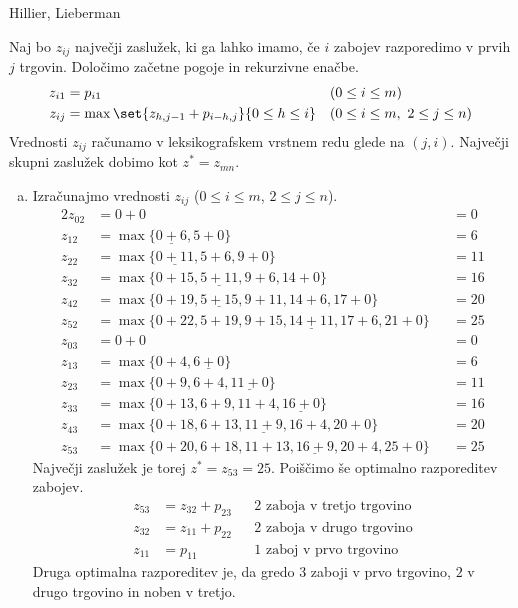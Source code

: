 \begin{naloga}{Hillier, Lieberman}{\cite[Problem~11.3-1]{hl}}
\begin{odgovor}
Naj bo $z_{ij}$ največji zaslužek, ki ga lahko imamo,
če $i$ zabojev razporedimo v prvih $j$ trgovin.
Določimo začetne pogoje in rekurzivne enačbe.
\begin{align*}
z_{i1} &= p_{i1} && (0 \le i \le m) \\
z_{ij} &= \max\set{z_{h,j-1} + p_{i-h,j}}{0 \le h \le i}
&& (0 \le i \le m, \ 2 \le j \le n)
\end{align*}
Vrednosti $z_{ij}$ računamo v leksikografskem vrstnem redu glede na $(j, i)$.
Največji skupni zaslužek dobimo kot $z^* = z_{mn}$.
\begin{enumerate}[(a)]
\item Izračunajmo vrednosti $z_{ij}$ ($0 \le i \le m$, $2 \le j \le n$).
\begin{alignat*}{2}
z_{02} &= 0+0 &&= 0 \\
z_{12} &= \max\{\underline{0+6}, 5+0\} &&= 6 \\
z_{22} &= \max\{\underline{0+11}, 5+6, 9+0\} &&= 11 \\
z_{32} &= \max\{0+15, \underline{5+11}, 9+6, 14+0\} &&= 16 \\
z_{42} &= \max\{0+19, \underline{5+15}, 9+11, 14+6, 17+0\} &&= 20 \\
z_{52} &= \max\{0+22, 5+19, 9+15, \underline{14+11}, 17+6, 21+0\} &&= 25 \\
z_{03} &= 0+0 &&= 0 \\
z_{13} &= \max\{0+4, \underline{6+0}\} &&= 6 \\
z_{23} &= \max\{0+9, 6+4, \underline{11+0}\} &&= 11 \\
z_{33} &= \max\{0+13, 6+9, 11+4, \underline{16+0}\} &&= 16 \\
z_{43} &= \max\{0+18, 6+13, \underline{11+9}, 16+4, 20+0\} &&= 20 \\
z_{53} &= \max\{0+20, 6+18, 11+13, \underline{16+9}, 20+4, 25+0\} &&= 25
\end{alignat*}
Največji zaslužek je torej $z^* = z_{53} = 25$.
Poiščimo še optimalno razporeditev zabojev.
\begin{align*}
z_{53} &= z_{32} + p_{23} && \text{$2$ zaboja v tretjo trgovino} \\
z_{32} &= z_{11} + p_{22} && \text{$2$ zaboja v drugo trgovino} \\
z_{11} &= p_{11}          && \text{$1$ zaboj v prvo trgovino}
\end{align*}
Druga optimalna razporeditev je,
da gredo $3$ zaboji v prvo trgovino, $2$ v drugo trgovino in noben v tretjo.


\end{enumerate}
\end{odgovor}
\end{naloga}
